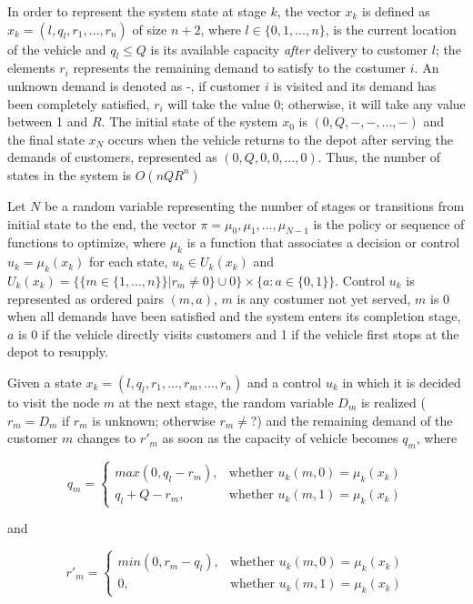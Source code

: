 In order to represent the system state at stage $k$, the vector $x_k$ is defined as $x_k=(l,q_l, r_1,\ldots,r_n)$ of size $n+2$, where $l \in \{0,1,\ldots,n\}$, is the current location of the vehicle and $q_l \leq Q$ is its available capacity \textit{after} delivery to customer $l$; the elements $r_i$ represents the remaining demand to satisfy to the costumer $i$. An unknown demand is denoted as -, if customer $i$ is visited and its demand has been completely satisfied, $r_i$ will take the value 0; otherwise, it will take any value between 1 and $R$. The initial state of the system $x_0$ is $(0,Q,-,-,\ldots,-)$ and the final state $x_N$ occurs when the vehicle returns to the depot after serving the demands of customers, represented as $(0,Q,0,0,\ldots,0)$. Thus, the number of states in the system is $O(nQR^n)$

Let $N$ be a random variable representing the number of stages or transitions from initial state to the end, the vector $\pi = {\mu_0, \mu_1,\ldots, \mu_{N-1}}$ is the policy or sequence of functions to optimize, where $\mu_k$ is a function that associates a decision or control $u_k=\mu_k(x_k)$ for each state, $u_k \in U_k(x_k)$ and $U_k(x_k) = \{\{m \in \{1,\ldots,n\}\}|r_m\neq0\}\cup 0\} \times \{a:a \in \{0,1\}\}$. Control $u_k$ is represented as ordered pairs $(m,a)$, $m$ is any costumer not yet served, $m$ is 0 when all demands have been satisfied and the system enters its completion stage, $a$ is 0 if the vehicle directly visits customers and 1 if the vehicle first stops at the depot to resupply.

Given a state $x_k=(l,q_l,r_1,\ldots,r_m,\ldots,r_n)$ and a control $u_k$ in which it is decided to visit the node $m$ at the next stage, the random variable $D_m$ is realized ($r_m = D_m$ if $r_m$ is unknown; otherwise $r_m \neq ?$) and the remaining demand of the customer $m$ changes to $r'_m$ as soon as the capacity of vehicle becomes $q_m$, where

\begin{equation}\label{eq:q_m}
    q_m = \left \{ \begin{array}{ll}
    max(0,q_l-r_m), & \text{whether } u_k(m,0)=\mu_k(x_k)\\
    q_l+Q-r_m, & \text{whether } u_k(m,1)=\mu_k(x_k)
    \end{array} \right.
 \end{equation}

and

\begin{equation}\label{eq:r_m}
    r'_m = \left \{ \begin{array}{ll}
    min(0,r_m - q_l), & \text{whether } u_k(m,0)=\mu_k(x_k)\\
    0, & \text{whether } u_k(m,1)=\mu_k(x_k)
    \end{array} \right.
 \end{equation}

